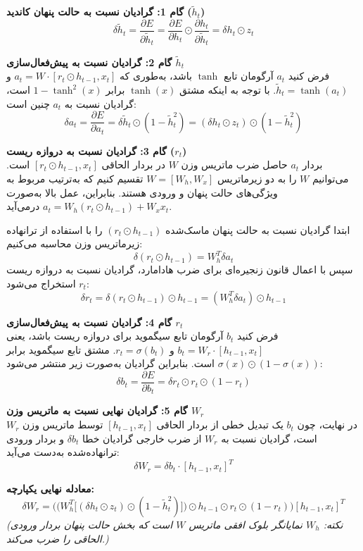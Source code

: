 \documentclass[12pt,a4paper]{article}
\begin{document}
	\begin{tcolorbox}[colback=softgreen,colframe=mygreen,title=\textbf{استنتاج گام‌به‌گام}]
		\textbf{گام 1: گرادیان نسبت به حالت پنهان کاندید ($\tilde{h}_t$)} \\
		$$ \delta \tilde{h}_t = \frac{\partial E}{\partial \tilde{h}_t} = \frac{\partial E}{\partial h_t} \odot \frac{\partial h_t}{\partial \tilde{h}_t} = \delta h_t \odot z_t $$
		
		\textbf{گام 2: گرادیان نسبت به پیش‌فعال‌سازی $\tilde{h}_t$} \\
		فرض کنید $a_t$ آرگومان تابع $\tanh$ باشد، به‌طوری که $a_t = W \cdot [r_t \odot h_{t-1}, x_t]$ و $\tilde{h}_t = \tanh(a_t)$. با توجه به اینکه مشتق $\tanh(x)$ برابر $1 - \tanh^2(x)$ است، گرادیان نسبت به $a_t$ چنین است:
		$$ \delta a_t = \frac{\partial E}{\partial a_t} = \delta \tilde{h}_t \odot (1 - \tilde{h}_t^2) = (\delta h_t \odot z_t) \odot (1 - \tilde{h}_t^2) $$
		
		\textbf{گام 3: گرادیان نسبت به دروازه ریست ($r_t$)} \\
		بردار $a_t$ حاصل ضرب ماتریس وزن $W$ در بردار الحاقی $[r_t \odot h_{t-1}, x_t]$ است. می‌توانیم $W$ را به دو زیرماتریس $W = [W_h, W_x]$ تقسیم کنیم که به‌ترتیب مربوط به ویژگی‌های حالت پنهان و ورودی هستند. بنابراین، عمل بالا به‌صورت $a_t = W_h (r_t \odot h_{t-1}) + W_x x_t$ درمی‌آید.
		
		ابتدا گرادیان نسبت به حالت پنهان ماسک‌شده $(r_t \odot h_{t-1})$ را با استفاده از ترانهاده زیرماتریس وزن محاسبه می‌کنیم:
		$$ \delta (r_t \odot h_{t-1}) = W_h^T \delta a_t $$
		سپس با اعمال قانون زنجیره‌ای برای ضرب هادامارد، گرادیان نسبت به دروازه ریست $r_t$ استخراج می‌شود:
		$$ \delta r_t = \delta (r_t \odot h_{t-1}) \odot h_{t-1} = (W_h^T \delta a_t) \odot h_{t-1} $$
		
		\textbf{گام 4: گرادیان نسبت به پیش‌فعال‌سازی $r_t$} \\
		فرض کنید $b_t$ آرگومان تابع سیگموید برای دروازه ریست باشد، یعنی $b_t = W_r \cdot [h_{t-1}, x_t]$ و $r_t = \sigma(b_t)$. مشتق تابع سیگموید برابر $\sigma(x) \odot (1 - \sigma(x))$ است. بنابراین گرادیان به‌صورت زیر منتشر می‌شود:
		$$ \delta b_t = \frac{\partial E}{\partial b_t} = \delta r_t \odot r_t \odot (1 - r_t) $$
		
		\textbf{گام 5: گرادیان نهایی نسبت به ماتریس وزن $W_r$} \\
		در نهایت، چون $b_t$ یک تبدیل خطی از بردار الحاقی $[h_{t-1}, x_t]$ توسط ماتریس وزن $W_r$ است، گرادیان نسبت به $W_r$ از ضرب خارجی گرادیان خطا $\delta b_t$ و بردار ورودی ترانهاده‌شده به‌دست می‌آید:
		$$ \delta W_r = \delta b_t \cdot [h_{t-1}, x_t]^T $$
		
		\vspace{0.3cm}
		\textbf{معادله نهایی یکپارچه:}
		$$ \delta W_r = \Big( \big( W_h^T \big[ (\delta h_t \odot z_t) \odot (1 - \tilde{h}_t^2) \big] \big) \odot h_{t-1} \odot r_t \odot (1 - r_t) \Big) [h_{t-1}, x_t]^T $$
		\textit{(نکته: $W_h$ نمایانگر بلوک افقی ماتریس $W$ است که بخش حالت پنهان بردار ورودی الحاقی را ضرب می‌کند.)}
	\end{tcolorbox}
	
\end{document}

